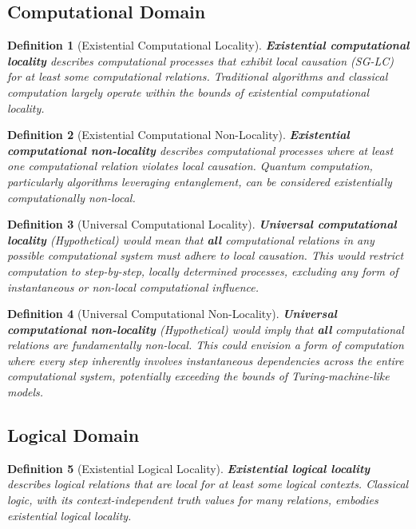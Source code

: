 \documentclass{article}
\newtheorem{definition}{Definition}
\begin{document}
	\subsection{Computational Domain}

	\begin{definition}[Existential Computational Locality]
		\textbf{Existential computational locality} describes computational processes that exhibit local causation (SG-LC) for at least some computational relations.  Traditional algorithms and classical computation largely operate within the bounds of existential computational locality.
	\end{definition}

	\begin{definition}[Existential Computational Non-Locality]
		\textbf{Existential computational non-locality} describes computational processes where at least one computational relation violates local causation. Quantum computation, particularly algorithms leveraging entanglement, can be considered existentially computationally non-local.
	\end{definition}

	\begin{definition}[Universal Computational Locality]
		\textbf{Universal computational locality} (Hypothetical) would mean that \textbf{all} computational relations in any possible computational system must adhere to local causation. This would restrict computation to step-by-step, locally determined processes, excluding any form of instantaneous or non-local computational influence.
	\end{definition}

	\begin{definition}[Universal Computational Non-Locality]
		\textbf{Universal computational non-locality} (Hypothetical) would imply that \textbf{all} computational relations are fundamentally non-local.  This could envision a form of computation where every step inherently involves instantaneous dependencies across the entire computational system, potentially exceeding the bounds of Turing-machine-like models.
	\end{definition}

	\subsection{Logical Domain}

	\begin{definition}[Existential Logical Locality]
		\textbf{Existential logical locality} describes logical relations that are local for at least some logical contexts. Classical logic, with its context-independent truth values for many relations, embodies existential logical locality.
	\end{definition}
\end{document}
